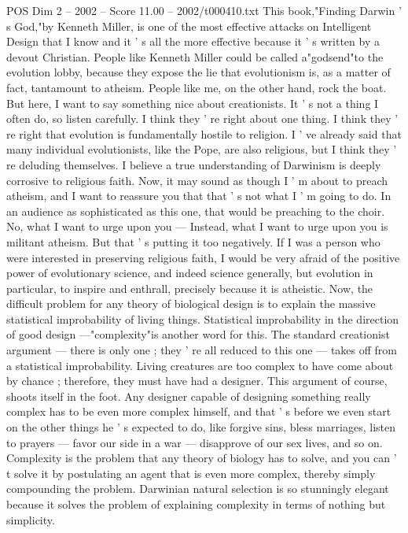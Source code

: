 \begin{textsample}{POS Dim 2 – 2002 – Score 11.00 – 2002/t000410.txt}
This book,"Finding Darwin ' s God,"by Kenneth Miller, is one of the most effective attacks on Intelligent Design that I know and it ' s all the more effective because it ' s written by a devout Christian.
People like Kenneth Miller could be called a"godsend"to the evolution lobby, because they expose the lie that evolutionism is, as a matter of fact, tantamount to atheism.
People like me, on the other hand, rock the boat.
But here, I want to say something nice about creationists.
It ' s not a thing I often do, so listen carefully.
I think they ' re right about one thing.
I think they ' re right that evolution is fundamentally hostile to religion.
I ' ve already said that many individual evolutionists, like the Pope, are also religious, but I think they ' re deluding themselves.
I believe a true understanding of Darwinism is deeply corrosive to religious faith.
Now, it may sound as though I ' m about to preach atheism, and I want to reassure you that that ' s not what I ' m going to do.
In an audience as sophisticated as this one, that would be preaching to the choir.
No, what I want to urge upon you — Instead, what I want to urge upon you is militant atheism.
But that ' s putting it too negatively.
If I was a person who were interested in preserving religious faith, I would be very afraid of the positive power of evolutionary science, and indeed science generally, but evolution in particular, to inspire and enthrall, precisely because it is atheistic.
Now, the difficult problem for any theory of biological design is to explain the massive statistical improbability of living things.
Statistical improbability in the direction of good design —"complexity"is another word for this.
The standard creationist argument — there is only one ; they ' re all reduced to this one — takes off from a statistical improbability.
Living creatures are too complex to have come about by chance ; therefore, they must have had a designer.
This argument of course, shoots itself in the foot.
Any designer capable of designing something really complex has to be even more complex himself, and that ' s before we even start on the other things he ' s expected to do, like forgive sins, bless marriages, listen to prayers — favor our side in a war — disapprove of our sex lives, and so on.
Complexity is the problem that any theory of biology has to solve, and you can ' t solve it by postulating an agent that is even more complex, thereby simply compounding the problem.
Darwinian natural selection is so stunningly elegant because it solves the problem of explaining complexity in terms of nothing but simplicity.

\end{textsample}
